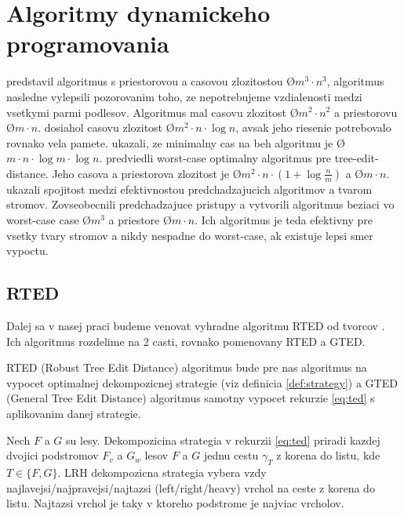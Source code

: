 \section{Algoritmy dynamickeho programovania}

\citet{TAI} predstavil algoritmus s priestorovou a casovou zlozitostou \O{$m^3 \cdot n^3$},
\citet{ZHANGSHASHA} algoritmus nasledne vylepsili pozorovanim toho, ze nepotrebujeme
vzdialenosti medzi vsetkymi parmi podlesov. Algoritmus mal casovu zlozitost \O{$m^2 \cdot n^2$}
a priestorovu \O{$m \cdot n$}. \citet{KLEIN} dosiahol casovu zlozitost \O{$m^2 \cdot n \cdot \log{n}$},
avsak jeho riesenie potrebovalo rovnako vela pamete.
\citet{DALUCQ} ukazali, ze minimalny cas na beh algoritmu je \O{$m \cdot n \cdot \log{m} \cdot \log{n}$}.
\citet{DMRW} predviedli worst-case optimalny algoritmus pre tree-edit-distance.
Jeho casova a priestorova zlozitost je \O{$m^2 \cdot n \cdot (1 + \log{\frac{n}{m}})$} a
\O{$m \cdot n$}. \citet{RTED} ukazali spojitost medzi efektivnostou predchadzajucich algoritmov
a tvarom stromov. Zovseobecnili predchadzajuce pristupy a vytvorili algoritmus beziaci
vo worst-case case \O{$m^3$} a priestore \O{$m \cdot n$}. Ich algoritmus je teda efektivny pre vsetky
tvary stromov a nikdy nespadne do worst-case, ak existuje lepsi smer vypoctu. 



\subsection{RTED}

Dalej sa v nasej praci budeme venovat vyhradne algoritmu RTED od tvorcov \citet{RTED}.
Ich algoritmus rozdelime na 2 casti, rovnako pomenovany RTED a GTED.

RTED (Robust Tree Edit Distance) algoritmus bude pre nas algoritmus na vypocet
optimalnej dekompozicnej strategie (viz definicia \ref{def:strategy})
a GTED (General Tree Edit Distance) algoritmus samotny vypocet rekurzie \ref{eq:ted}
s aplikovanim danej strategie.

\begin{definice}\label{def:strategy}
	Nech $F$ a $G$ su lesy. Dekompozicina strategia v rekurzii \ref{eq:ted} priradi
  kazdej dvojici podstromov $F_{v}$ a $G_{w}$ lesov $F$ a $G$ jednu cestu $\gamma_{T}$
  z korena do listu, kde $T \in \{F, G\}$.
	LRH dekompozicna strategia vybera vzdy najlavejsi/najpravejsi/najtazsi
	(left/right/heavy) vrchol na ceste z korena do listu. Najtazsi vrchol je taky
	v ktoreho podstrome je najviac vrcholov. 
\end{definice}


